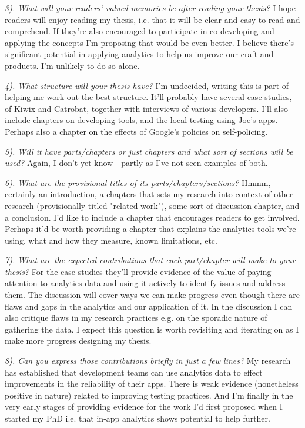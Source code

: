 \emph{3). What will your readers’ valued memories be after reading your
thesis?} I hope readers will enjoy reading my thesis, i.e. that it will be clear and easy to read and comprehend. If they're also encouraged to participate in co-developing and applying the concepts I'm proposing that would be even better. I believe there's significant potential in applying analytics to help us improve our craft and products. I'm unlikely to do so alone.

\emph{4). What structure will your thesis have?} I'm undecided, writing this is part of helping me work out the best structure. It'll probably have several case studies, of Kiwix and Catrobat, together with interviews of various developers. I'll also include chapters on developing tools, and the local testing using Joe's apps. Perhaps also a chapter on the effects of Google's policies on self-policing.

\emph{5). Will it have parts/chapters or just chapters and what sort of sections
will be used?} Again, I don't yet know - partly as I've not seen examples of both.

\emph{6). What are the provisional titles of its parts/chapters/sections?} Hmmm, certainly an introduction, a chapters that sets my research into context of other research (provisionally titled "related work"), some sort of discussion chapter, and a conclusion. I'd like to include a chapter that encourages readers to get involved. Perhaps it'd be worth providing a chapter that explains the analytics tools we're using, what and how they measure, known limitations, etc.

\emph{7). What are the expected contributions that each part/chapter will
make to your thesis?} For the case studies they'll provide evidence of the value of paying attention to analytics data and using it actively to identify issues and address them. The discussion will cover ways we can make progress even though there are flaws and gaps in the analytics and our application of it. In the discussion I can also critique flaws in my research practices e.g. on the sporadic nature of gathering the data. I expect this question is worth revisiting and iterating on as I make more progress designing my thesis.

\emph{8). Can you express those contributions briefly in just a few lines?} My research has established that development teams can use analytics data to effect improvements in the reliability of their apps. There is weak evidence (nonetheless positive in nature) related to improving testing practices. And I'm finally in the very early stages of providing evidence for the work I'd first proposed when I started my PhD i.e. that in-app analytics shows potential to help further.

